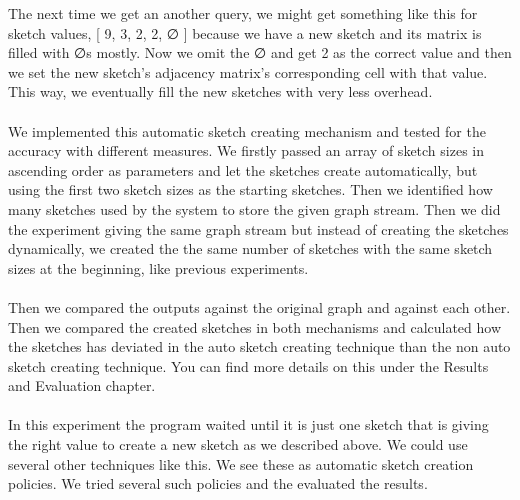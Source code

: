 \documentclass[12pt]{report}
\numberwithin{figure}{section}
\numberwithin{table}{section}
\begin{document}
The next time we get an another query, we might get something like this for sketch values, [ 9, 3, 2, 2, ∅ ] because we have a new sketch and its matrix is filled with ∅s mostly. Now we omit the ∅ and get 2 as the correct value and then we set the new sketch’s adjacency matrix’s corresponding cell with that value. This way, we eventually fill the new sketches with very less overhead.  

\paragraph{}

We implemented this automatic sketch creating mechanism and tested for the accuracy with different measures. We firstly passed an array of sketch sizes in ascending order as parameters and let the sketches create automatically, but using the first two sketch sizes as the starting sketches. Then we identified how many sketches used by the system to store the given graph stream. Then we did the experiment giving the same graph stream but instead of creating the sketches dynamically, we created the the same number of sketches with the same sketch sizes at the beginning, like previous experiments.

\paragraph{}

Then we compared the outputs against the original graph and against each other. Then we compared the created sketches in both mechanisms and calculated how the sketches has deviated in the auto sketch creating technique  than the non auto sketch creating technique. You can find more details on this under the Results and Evaluation chapter. 

\paragraph{}

In this experiment the program waited until it is just one sketch that is giving the right value to create a new sketch as we described above. We could use several other techniques like this. We see these as automatic sketch creation policies. We tried several such policies and the evaluated the results. 

\paragraph{}
\end{document}

